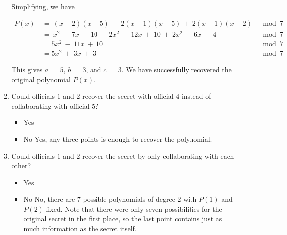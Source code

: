 \documentclass[11pt, preview]{standalone} %
\begin{document}
\begin{enumerate}
\begin{enumerate}
\begin{Freeform}{3}
Simplifying, we have  

 \begin{align*}
 P(x)\ &=\ (x - 2)(x - 5)\ +\ 2(x - 1)(x - 5)\ +\ 2(x - 1)(x - 2)\ &\bmod 7\\
 &=\ x^2\ -\ 7x\ +\ 10\ +\ 2x^2\ -\ 12x\ +\ 10\ +\ 2x^2\ -\ 6x\ +\ 4\ &\bmod 7\\
 &= 5x^2\ -\ 11x\ +\ 10\ &\bmod 7\\
 &= 5x^2\ +\ 3x\ +\ 3\ &\bmod 7 
 \end{align*}

 This gives $a\, =\, 5$, $b\, =\, 3$, and $c\, =\, 3$. We have successfully recovered the original polynomial $P(x)$.

 \end{Freeform}
 
 \item Could officials $1$ and $2$ recover the secret with official $4$ instead of collaborating with official $5$?
 \begin{Choices}
\begin{itemize}
\TrueChoice\item Yes 
\FalseChoice\item No
\Solution Yes, any three points is enough to recover the polynomial.
\end{itemize}
\end{Choices}

 \item Could officials $1$ and $2$ recover the secret by only collaborating with each other?
 \begin{Choices}
\begin{itemize}
\FalseChoice\item Yes
\TrueChoice\item No
\Solution No, there are $7$ possible polynomials of degree $2$ with $P(1)$ and $P(2)$ fixed. Note that there were only seven possibilities for the original secret in the first place, so the last point contains just as much information as the secret itself.
\end{itemize}
\end{Choices}
 
\end{enumerate}

\end{enumerate}
\end{document}
